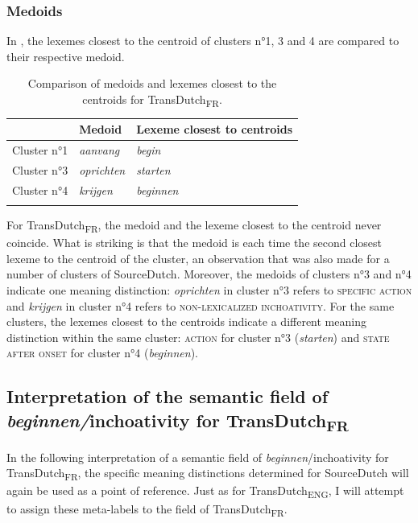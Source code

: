 \subsubsection{Medoids}
\label{sec:4.4.3.2}  
In , the lexemes closest to the centroid of clusters n°1, 3 and 4 are compared to their respective medoid.

\begin{table}
\caption{\label{tab:4:16}Comparison of medoids and lexemes closest to the centroids for TransDutch\textsubscript{FR}.}
\begin{tabularx}{\textwidth}{XXl}
\lsptoprule
& Medoid & Lexeme closest to centroids\\
\midrule 
Cluster n°1 & \itshape aanvang   & \itshape begin\\
Cluster n°3 & \itshape oprichten & \itshape starten\\
Cluster n°4 & \itshape krijgen   & \itshape beginnen\\
\lspbottomrule
\end{tabularx}
\end{table}

For TransDutch\textsubscript{FR}, the medoid and the lexeme closest to the centroid never coincide. What is striking is that the medoid is each time the second closest lexeme to the centroid of the cluster, an observation that was also made for a number of clusters of SourceDutch. Moreover, the medoids of clusters n°3 and n°4 indicate one meaning distinction: \textit{oprichten} in cluster n°3 refers to {\textsc{specific}} \textsc{action} and \textit{krijgen} in cluster n°4 refers to {\textsc{non-lexicalized inchoativity}}. For the same clusters, the lexemes closest to the centroids indicate a different meaning distinction within the same cluster: \textsc{action} for cluster n°3 (\textit{starten}) and \textsc{state after onset} for cluster n°4 (\textit{beginnen}).

\subsection{Interpretation of the semantic field of \textit{beginnen/}inchoativity for TransDutch\textsubscript{FR}}
\label{sec:4.4.4}  
In the following interpretation of a semantic field of \textit{beginnen}/inchoativity for TransDutch\textsubscript{FR}, the specific meaning distinctions determined for SourceDutch will again be used as a point of reference. Just as for TransDutch\textsubscript{ENG}, I will attempt to assign these meta-labels to the field of TransDutch\textsubscript{FR}.

